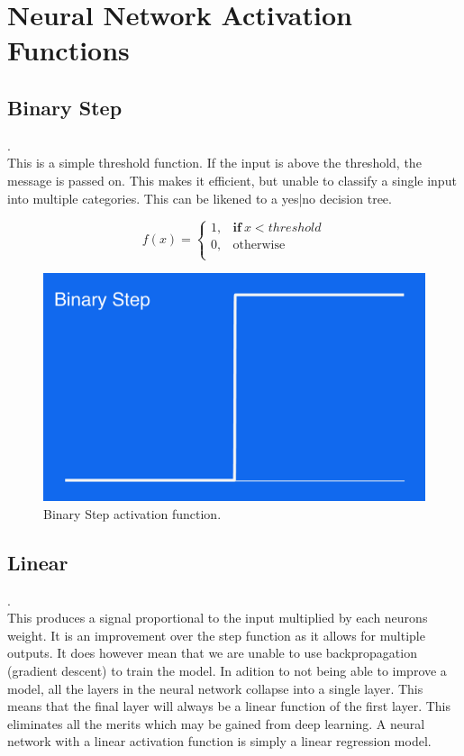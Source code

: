 \chapter{Neural Network Activation Functions}\label{appendix:activation}


\section{Binary Step}.\\
This is a simple threshold function. If the input is above the threshold, the message is passed on. This makes it efficient, but unable to classify a single input into multiple categories. This can be likened to a yes|no decision tree.

\begin{equation}
f(x) =
    \begin{cases}
      1 , & \mathbf{if} \ x < threshold \\
      0 , & \text{otherwise}\\

    \end{cases}
  \end{equation}

\begin{figure}[H]
\centering
\includegraphics[width=.265\textwidth]{4fig/binary.png}
\caption{Binary Step activation function.}
\end{figure}



\section{Linear}.\\

This produces a signal proportional to the input multiplied by each neurons weight. It is an improvement over the step function as it allows for multiple outputs. It does however mean that we are unable to use backpropagation (gradient descent) to train the model. In adition to not being able to improve a model, all the layers in the neural network collapse into a single layer. This means that the final layer will always be a linear function of the first layer. This eliminates all the merits which may be gained from deep learning. A neural network with a linear activation function is simply a linear regression model.

